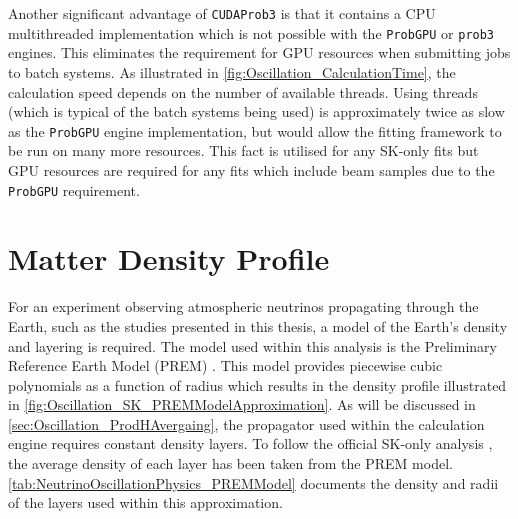 Another significant advantage of \texttt{CUDAProb3} is that it contains a CPU multithreaded implementation which is not possible with the \texttt{ProbGPU} or \texttt{prob3} engines. This eliminates the requirement for GPU resources when submitting jobs to batch systems. As illustrated in \autoref{fig:Oscillation_CalculationTime}, the calculation speed depends on the number of available threads. Using  threads (which is typical of the batch systems being used) is approximately twice as slow as the \texttt{ProbGPU} engine implementation, but would allow the fitting framework to be run on many more resources. This fact is utilised for any SK-only fits but GPU resources are required for any fits which include beam samples due to the \texttt{ProbGPU} requirement.

\section{Matter Density Profile}
\label{sec:Oscillation_MatterDensity}

For an experiment observing atmospheric neutrinos propagating through the Earth, such as the studies presented in this thesis, a model of the Earth's density and layering is required. The model used within this analysis is the Preliminary Reference Earth Model (PREM) \cite{Dziewonski1981-sp}. This model provides piecewise cubic polynomials as a function of radius which results in the density profile illustrated in \autoref{fig:Oscillation_SK_PREMModelApproximation}. As will be discussed in \autoref{sec:Oscillation_ProdHAvergaing}, the propagator used within the calculation engine requires constant density layers. To follow the official SK-only analysis \cite{thesis_roger}, the average density of each layer has been taken from the PREM model. \autoref{tab:NeutrinoOscillationPhysics_PREMModel} documents the density and radii of the layers used within this approximation.

